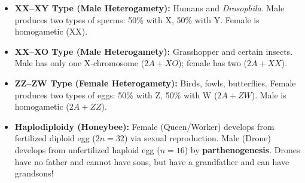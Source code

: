 \documentclass[10pt,a4paper]{article}
\begin{document}
\begin{conceptbox}
\begin{itemize}
  \item \textbf{XX--XY Type (Male Heterogamety):} Humans and \textit{Drosophila}. Male produces two types of sperms: 50\% with X, 50\% with Y. Female is homogametic (XX).
  \item \textbf{XX--XO Type (Male Heterogamety):} Grasshopper and certain insects. Male has only one X-chromosome ($2A + XO$); female has two ($2A + XX$).
  \item \textbf{ZZ--ZW Type (Female Heterogamety):} Birds, fowls, butterflies. Female produces two types of eggs: 50\% with Z, 50\% with W ($2A + ZW$). Male is homogametic ($2A + ZZ$).
  \item \textbf{Haplodiploidy (Honeybee):} Female (Queen/Worker) develops from fertilized diploid egg ($2n = 32$) via sexual reproduction. Male (Drone) develops from unfertilized haploid egg ($n = 16$) by \textbf{parthenogenesis}. Drones have no father and cannot have sons, but have a grandfather and can have grandsons!
\end{itemize}
\end{conceptbox}
\end{document}
